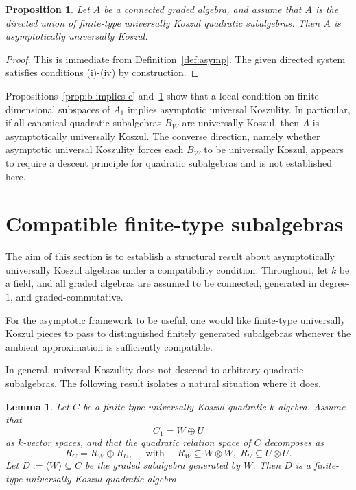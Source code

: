 \documentclass[11pt]{amsart}
\numberwithin{equation}{section}
\newtheorem{proposition}[theorem]{Proposition}
\newtheorem{lemma}[theorem]{Lemma}
\theoremstyle{definition}
\begin{document}
	\begin{proposition}\label{prop:c-implies-a}
		Let $A$ be a connected graded algebra, and assume that $A$ is the directed union of finite-type universally Koszul quadratic subalgebras. Then $A$ is asymptotically universally Koszul.
	\end{proposition}
	
	\begin{proof}
		This is immediate from Definition~\ref{def:asymp}. The given directed system satisfies conditions \textrm{(i)}-\textrm{(iv)} by construction.
	\end{proof}
	

	Propositions~\ref{prop:b-implies-c} and~\ref{prop:c-implies-a} show that a local condition on finite-dimensional subspaces of $A_1$ implies asymptotic universal Koszulity. In particular, if all canonical quadratic subalgebras $B_W$ are universally Koszul, then $A$ is asymptotically universally Koszul. The converse direction, namely whether asymptotic universal Koszulity forces each $B_W$ to be universally Koszul, appears to require a descent principle for quadratic subalgebras and is not established here.

	
	
	
	\section{Compatible finite-type subalgebras}
	\label{sec:structural}
	
	The aim of this section is to establish a structural result about asymptotically universally Koszul algebras under a compatibility condition. Throughout, let $k$ be a field, and all graded algebras are assumed to be connected, generated in degree-$1$, and graded-commutative. 
	
	For the asymptotic framework to be useful, one would like finite-type universally Koszul pieces to pass to distinguished finitely generated subalgebras whenever the ambient approximation is sufficiently compatible.
	
	In general, universal Koszulity does not descend to arbitrary quadratic subalgebras. The following result isolates a natural situation where it does.
	
	\begin{lemma}
		\label{lem:quadratic-subalgebra-compatible}
		Let $C$ be a finite-type universally Koszul quadratic $k$-algebra. Assume that \[C_1 = W \oplus U\]
		as $k$-vector spaces, and that the quadratic relation space of \(C\) decomposes as
		\[R_C = R_W \oplus R_U,\quad \text{ with } \quad R_W \subseteq W \otimes W,\; R_U \subseteq U \otimes U.	\]
		Let $D := \langle W \rangle \subseteq C$ be the graded subalgebra generated by $W$. Then $D$ is a finite-type universally Koszul quadratic algebra.
	\end{lemma}
	
\end{document}
